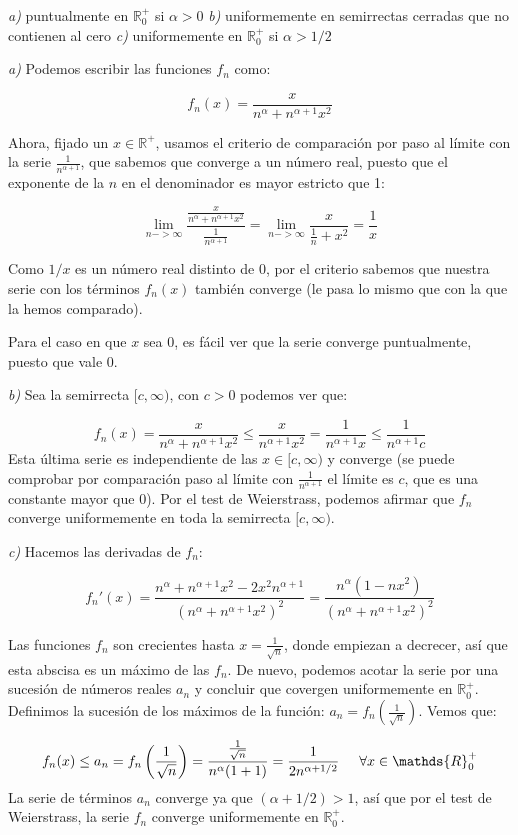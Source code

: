 
\textit{a)} puntualmente en $\mathds{R}^+_0$ si $\alpha > 0$
\textit{b)} uniformemente en semirrectas cerradas que no contienen al cero
\textit{c)} uniformemente en $\mathds{R}^+_0$ si $\alpha > 1/2$

\textit{a)} 
Podemos escribir las funciones $f_n$ como:

$$f_n(x) = \frac{x}{n^\alpha+n^{\alpha+1}x^2} $$

Ahora, fijado un $x\in\mathds{R^+}$, usamos el criterio de comparación por paso al límite con la serie $\frac{1}{n^{\alpha+1}}$, que sabemos que converge a un número real, puesto que el exponente de la $n$ en el denominador es mayor estricto que 1:

$$\lim\limits_{n->\infty} \frac{\frac{x}{n^\alpha+n^{\alpha+1}x^2}}{\frac{1}{n^{\alpha+1}}} = \lim\limits_{n->\infty} \frac{x}{\frac{1}{n}+x^2} = \frac{1}{x} $$

Como $1/x$ es un número real distinto de 0, por el criterio sabemos que nuestra serie con los términos $f_n(x)$ también converge (le pasa lo mismo que con la que la hemos comparado).

Para el caso en que $x$ sea 0, es fácil ver que la serie converge puntualmente, puesto que vale 0.


\textit{b)}  Sea la semirrecta $[c, \infty)$, con $c > 0$ podemos ver que:

$$f_n(x) = \frac{x}{n^\alpha+n^{\alpha+1}x^2} \leq \frac{x}{n^{\alpha+1}x^2} = \frac{1}{n^{\alpha+1}x} \leq \frac{1}{n^{\alpha+1}c}$$
Esta última serie es independiente de las $x\in [c, \infty)$ y converge (se puede comprobar por comparación paso al límite con $\frac{1}{n^{\alpha+1}}$ el límite es $c$, que es una constante mayor que 0). Por el test de Weierstrass, podemos afirmar que $f_n$ converge uniformemente en toda la semirrecta $[c, \infty)$.


\textit{c)} Hacemos las derivadas de $f_n$:

$$f_n'(x) = \frac{n^\alpha + n^{\alpha+1}x^2-2x^2n^{\alpha+1}}{(n^\alpha+n^{\alpha+1}x^2)^2} = \frac{n^\alpha(1 - nx^2)}{(n^\alpha+n^{\alpha+1}x^2)^2}$$

Las funciones $f_n$ son crecientes hasta $x=\frac{1}{\sqrt{n}}$, donde empiezan a decrecer, así que esta abscisa es un máximo de las $f_n$. De nuevo, podemos acotar la serie por una sucesión de números reales $a_n$ y concluir que covergen uniformemente en $\mathds{R}^+_0$. Definimos la sucesión de los máximos de la función: $a_n = f_n\left(\frac{1}{\sqrt{n}}\right)$. Vemos que:

$$f_n(x) \leq a_n = f_n\left(\frac{1}{\sqrt{n}}\right) = \frac{\frac{1}{\sqrt{n}}}{n^\alpha(1+1)} = \frac{1}{2n^{\alpha+1/2}} \hspace{0.5cm} \forall x \in \mathds{R}^+_0$$
La serie de términos $a_n$ converge ya que $(\alpha + 1/2) > 1$, así que por el test de Weierstrass, la serie $f_n$ converge uniformemente en $\mathds{R}^+_0$.
	